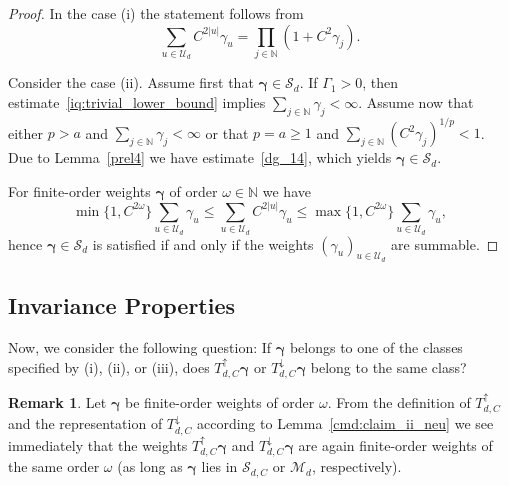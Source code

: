 \documentclass{article}
\newcommand{\N}  {{\mathbb N}}
\newcommand{\bg}{{\boldsymbol{\gamma}}}
\newcommand{\U}  {\mathcal{U}}
\newcommand{\M}  {\mathcal{M}}
\newcommand{\SSS}{\mathcal{S}}
\newcommand{\lo}{\downarrow}
\newcommand{\up}{\uparrow}
\theoremstyle{plain}
\theoremstyle{definition}
\newtheorem{rem}{Remark}
\begin{document}
\begin{proof}
In the case (i) the statement follows from
\[
\sum_{u \in \U_d} C^{2|u|} \gamma_u = \prod_{j \in \N} (1+ C^2 \gamma_j).
\]

Consider the case (ii). Assume first that $\bg \in \SSS_{d}$. 
If $\Gamma_1 >0$, then estimate~\eqref{iq:trivial_lower_bound} 
implies $\sum_{j\in \N} \gamma_j < \infty$. 
Assume now that either $p>a$ and $\sum_{j\in \N} \gamma_j < \infty$
or that $p=a \ge 1$ and $\sum_{j\in \N} \left( C^2 \gamma_j \right)^{1/p} 
< 1$. 
Due to Lemma~\ref{prel4} we have
estimate~\eqref{dg_14}, which yields $\bg \in \SSS_d$.

For finite-order weights $\bg$ of order $\omega \in \N$ we have 
\begin{equation*}
\min\{1,C^{2\omega}\} \sum_{u\in\U_d}\gamma_u \le  
\sum_{u\in\U_d} C^{2|u|} \gamma_u  
\le \max\{1,C^{2\omega}\} \sum_{u\in\U_d}\gamma_u,
\end{equation*} 
hence $\bg \in \SSS_d$ is satisfied if and  
only if the weights $(\gamma_u)_{u\in \U_d}$ are summable. 
\end{proof}

\subsection{Invariance Properties}

Now,
we consider the following question:
If $\bg$ belongs to one of the classes specified by (i), (ii), or
(iii), does $T^\up_{d,C} \bg$ or $T^\lo_{d,C} \bg$ 
belong to the same class?

\begin{rem}\label{r3}
Let $\bg$ be finite-order weights of order $\omega$. From the definition
of $T^\up_{d,C}$ and the representation of
$T^\lo_{d,C}$ according
to Lemma~\ref{cmd:claim_ii_neu} we see immediately that the
weights $T^{\up}_{d,C} \bg$ and $T^{\lo}_{d,C} \bg$ 
are again finite-order 
weights of the same order $\omega$ (as long as $\bg$ lies in
$\SSS_{d,C}$ or $\M_d$, respectively).
\end{rem}
\end{document}
